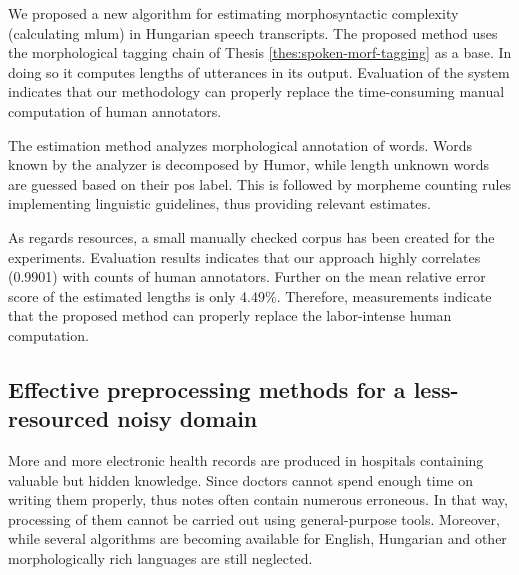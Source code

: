 \begin{core}
\begin{thesis}
\label{thes:mlu-estimation}
We proposed a new algorithm for estimating morphosyntactic complexity (calculating \acrlong{mlum}) in Hungarian speech transcripts.
The proposed method uses the morphological tagging chain of Thesis \ref{thes:spoken-morf-tagging} as a base.
In doing so it computes lengths of utterances in its output.
Evaluation of the system indicates that our methodology can properly replace the time-consuming manual computation of human annotators.
\end{thesis}

\begin{pub}
\cite{Matyus2014,Orosz2014c}
\end{pub}
\end{core}

The estimation method analyzes morphological annotation of words.
Words known by the analyzer is decomposed by Humor, while length unknown words are guessed based on their \acrshort{pos} label.
This is followed by morpheme counting rules implementing linguistic guidelines, thus providing relevant estimates.

As regards resources, a small manually checked corpus has been created for the experiments.
Evaluation results indicates that our approach highly correlates (0.9901) with counts of human annotators.
Further on the mean relative error score of the estimated lengths is only 4.49\%.
Therefore, measurements indicate that the proposed method can properly replace the labor-intense human computation.

\subsection{Effective preprocessing methods for a less-resourced noisy domain}
\label{thes:clin}

More and more electronic health records are produced in hospitals containing valuable but hidden knowledge.
Since doctors cannot spend enough time on writing them properly, thus notes often contain numerous erroneous.
In that way, processing of them cannot be carried out using general-purpose tools.
Moreover, while several algorithms are becoming available for English, Hungarian and other morphologically rich languages are still neglected.

